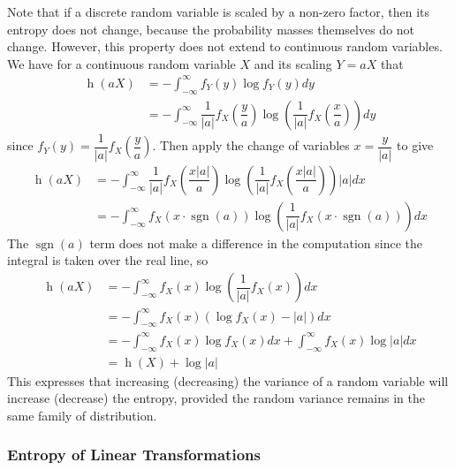 \documentclass[11pt]{report} %
\begin{document}
Note that if a discrete random variable is scaled by a non-zero factor, then its entropy does not change, because the probability masses themselves do not change. However, this property does not extend to continuous random variables. We have for a continuous random variable $X$ and its scaling $Y = aX$ that
\begin{align}
\operatorname{h}\left(aX\right) &= -\int_{-\infty}^{\infty}f_{Y}\left(y\right)\log f_{Y}\left(y\right) dy \\
&= -\int_{-\infty}^{\infty}\dfrac{1}{\left|a\right|}f_{X}\left(\dfrac{y}{a}\right)\log\left(\dfrac{1}{\left|a\right|} f_{X}\left(\dfrac{x}{a}\right) \right)dy
\end{align}
since $f_{Y}\left(y\right) = \dfrac{1}{\left|a\right|}f_{X}\left(\dfrac{y}{a}\right)$. Then apply the change of variables $x = \dfrac{y}{\left|a\right|}$ to give
\begin{align}
\operatorname{h}\left(aX\right) &= -\int_{-\infty}^{\infty}\dfrac{1}{\left|a\right|}f_{X}\left(\dfrac{x\left|a\right|}{a}\right)\log \left(\dfrac{1}{\left|a\right|} f_{X}\left(\dfrac{x\left|a\right|}{a}\right)\right) \left|a\right| dx \\
&= -\int_{-\infty}^{\infty}f_{X}\left(x\cdot\operatorname{sgn}\left(a\right)\right)\log\left(\dfrac{1}{\left|a\right|} f_{X}\left(x\cdot\operatorname{sgn}\left(a\right)\right)\right) dx
\end{align}
The $\operatorname{sgn}\left(a\right)$ term does not make a difference in the computation since the integral is taken over the real line, so
\begin{align}
\operatorname{h}\left(aX\right) &= -\int_{-\infty}^{\infty}f_{X}\left(x\right)\log \left(\dfrac{1}{\left|a\right|}f_{X}\left(x\right)\right) dx  \\
&= -\int_{-\infty}^{\infty}f_{X}\left(x\right)\left(\log f_{X}\left(x\right) - \left|a\right| \right) dx \\
&= -\int_{-\infty}^{\infty}f_{X}\left(x\right)\log f_{X}\left(x\right) dx +  \int_{-\infty}^{\infty}f_{X}\left(x\right)\log\left|a\right| dx \\
&= \operatorname{h}\left(X\right) + \log\left|a\right|
\end{align}
This expresses that increasing (decreasing) the variance of a random variable will increase (decrease) the entropy, provided the random variance remains in the same family of distribution.

\subsubsection{Entropy of Linear Transformations}
\end{document}
